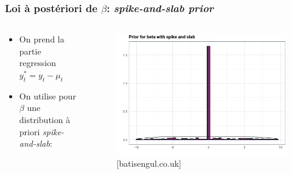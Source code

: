 \documentclass{presentation_template}
\begin{document}
\begin{frame}
    \frametitle{Loi à postériori de $\beta$: \textit{spike-and-slab prior}}

    \begin{columns}
        \begin{column}{0.8\textwidth}
            \vspace{-1cm}
            \begin{itemize}
                \item On prend la partie regression $y_{t}^{*}=y_{t}-\mu_{t}$
                \item On utilise pour $\beta$ une distribution à priori \textit{spike-and-slab}:
            \end{itemize}
            
        \end{column}
        \begin{column}{0.2\textwidth}

            \begin{figure}
                \includegraphics[width=\textwidth]{Figures/pike.png}
                \caption{[batisengul.co.uk]}
            \end{figure}
        

\end{column}
\end{columns}
\end{frame}
\end{document}
